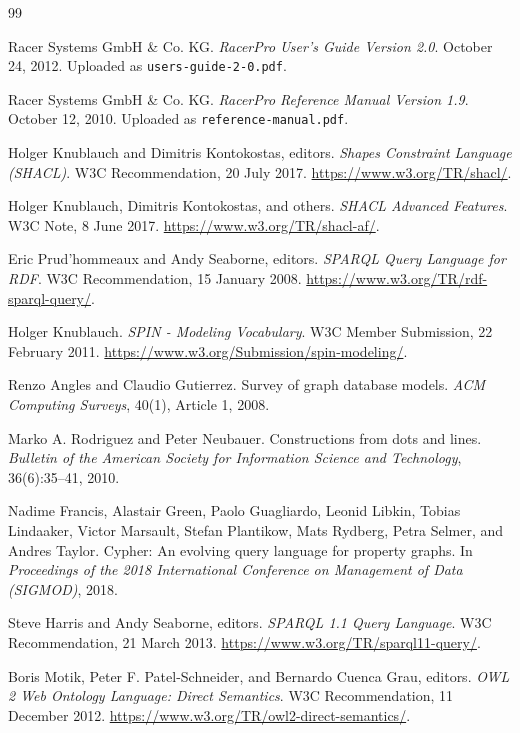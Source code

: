 \documentclass[11pt,letterpaper]{article}
\begin{document}
\begin{thebibliography}{99}

Racer Systems GmbH \& Co. KG.
\newblock \emph{RacerPro User's Guide Version 2.0}.
\newblock October 24, 2012. Uploaded as \texttt{users-guide-2-0.pdf}.

Racer Systems GmbH \& Co. KG.
\newblock \emph{RacerPro Reference Manual Version 1.9}.
\newblock October 12, 2010. Uploaded as \texttt{reference-manual.pdf}.

Holger Knublauch and Dimitris Kontokostas, editors.
\newblock \emph{Shapes Constraint Language (SHACL)}.
\newblock W3C Recommendation, 20 July 2017.
\newblock \url{https://www.w3.org/TR/shacl/}.

Holger Knublauch, Dimitris Kontokostas, and others.
\newblock \emph{SHACL Advanced Features}.
\newblock W3C Note, 8 June 2017.
\newblock \url{https://www.w3.org/TR/shacl-af/}.


Eric Prud'hommeaux and Andy Seaborne, editors.
\newblock \emph{SPARQL Query Language for RDF}.
\newblock W3C Recommendation, 15 January 2008.
\newblock \url{https://www.w3.org/TR/rdf-sparql-query/}.

Holger Knublauch.
\newblock \emph{SPIN - Modeling Vocabulary}.
\newblock W3C Member Submission, 22 February 2011.
\newblock \url{https://www.w3.org/Submission/spin-modeling/}.

Renzo Angles and Claudio Gutierrez.
\newblock Survey of graph database models.
\newblock \emph{ACM Computing Surveys}, 40(1), Article 1, 2008.

Marko A. Rodriguez and Peter Neubauer.
\newblock Constructions from dots and lines.
\newblock \emph{Bulletin of the American Society for Information Science and Technology}, 36(6):35--41, 2010.

Nadime Francis, Alastair Green, Paolo Guagliardo, Leonid Libkin, Tobias Lindaaker, Victor Marsault, Stefan Plantikow, Mats Rydberg, Petra Selmer, and Andres Taylor.
\newblock Cypher: An evolving query language for property graphs.
\newblock In \emph{Proceedings of the 2018 International Conference on Management of Data (SIGMOD)}, 2018.

Steve Harris and Andy Seaborne, editors.
\newblock \emph{SPARQL 1.1 Query Language}.
\newblock W3C Recommendation, 21 March 2013.
\newblock \url{https://www.w3.org/TR/sparql11-query/}.

Boris Motik, Peter F. Patel-Schneider, and Bernardo Cuenca Grau, editors.
\newblock \emph{OWL 2 Web Ontology Language: Direct Semantics}.
\newblock W3C Recommendation, 11 December 2012.
\newblock \url{https://www.w3.org/TR/owl2-direct-semantics/}.

\end{thebibliography}
\end{document}

